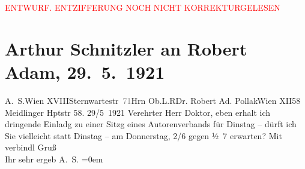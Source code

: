 
\begin{center}
            \textcolor{red}{ENTWURF. ENTZIFFERUNG NOCH NICHT KORREKTURGELESEN}
                      \end{center}
            
               \section[Arthur Schnitzler an Robert Adam, 29. 5. 1921]{ Arthur Schnitzler an Robert Adam, 29. 5. 1921}\nopagebreak{}\rehead{ }\begin{ledgroupsized}[t]{13cm}\normalsize\beginnumbering{} \toendnotes[C]{\smallbreak\pagebreak[2]} 
\pstart{}{\pb}A. S.\pend{}\pstart{}Wien XVIII\pend{}\pstart{}Sternwartestr \textcolor{gray}{71}\pend{}{\bigskip}\pstart{}Hrn Ob.L.R\pend{}\pstart{}Dr. Robert Ad. Pollak\pend{}\pstart{}Wien XII\pend{}\pstart{}58 Meidlinger Hptstr 58.\pend{}{\bigskip}\pstart
           \raggedleft{}{\pb}29/5 1921\pend
           \pstart{}Verehrter Herr Doktor,\pend\pstart
           eben erhalt ich dringende Einladg zu einer Sitzg eines Autorenverbands für
                        Dinstag – dürft ich Sie vielleicht statt Dinstag –
                    am {\pb}Donnerstag, 2/6{ }gegen ½ 7 erwarten?\pend
           \pstart
           Mit verbindl Gruß{\\[\baselineskip]}Ihr sehr ergeb \spacefill\mbox{A. S.}\pend
           \leftskip=0em{}\endnumbering{}\end{ledgroupsized}  \newcommand{\dateiname}{L02369}\newcommand{\titel}{Arthur Schnitzler an Robert Adam, 29. 5. 1921}\newcommand{\editorInnen}{Martin Anton Müller und Gerd-Hermann Susen}
      